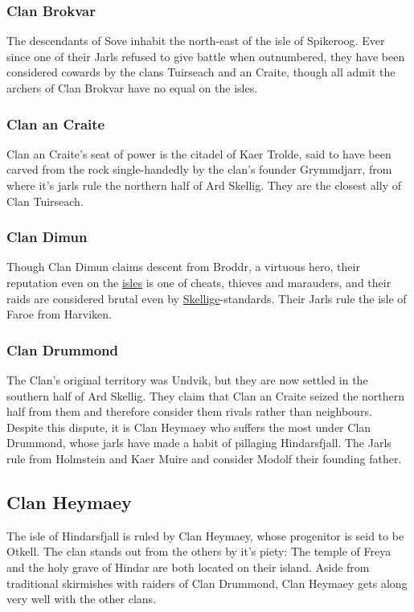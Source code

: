 \documentclass[parskip=full,11pt,%
footheight=38pt]{scrreport}
\begin{document}
\subsubsection{Clan Brokvar}
The descendants of Sove inhabit the north-east of the isle of Spikeroog. Ever since one of their Jarls refused to give battle when outnumbered, they have
been considered cowards by the clans Tuirseach and an Craite, though all admit the archers of Clan Brokvar have no equal on the isles.

\subsubsection{Clan an Craite}
Clan an Craite's seat of power is the citadel of Kaer Trolde, said to have been carved from the rock single-handedly by the clan's founder Grymmdjarr,
from where it's jarls rule the northern half of Ard Skellig. They are the closest ally of Clan Tuirseach.

\subsubsection{Clan Dimun}
Though Clan Dimun claims descent from Broddr, a virtuous hero, their reputation even on the \hyperref[region:skellige]{isles} is one of cheats, thieves
and marauders, and their raids are considered brutal even by \hyperref[region:skellige]{Skellige}-standards. Their Jarls rule the isle of Faroe from Harviken.

\subsubsection{Clan Drummond}
The Clan's original territory was Undvik, but they are now settled in the southern half of Ard Skellig. They claim that Clan an Craite seized the northern half
from them and therefore consider them rivals rather than neighbours. Despite this dispute, it is Clan Heymaey who suffers the most under Clan Drummond, whose
jarls have made a habit of pillaging Hindarsfjall. The Jarls rule from Holmstein and Kaer Muire and consider Modolf their founding father.

\subsection{Clan Heymaey}
The isle of Hindarsfjall is ruled by Clan Heymaey, whose progenitor is seid to be Otkell. The clan stands out from the others by it's piety: The temple of Freya
and the holy grave of Hindar are both located on their island. Aside from traditional skirmishes with raiders of Clan Drummond, Clan Heymaey gets along
very well with the other clans.
\end{document}
